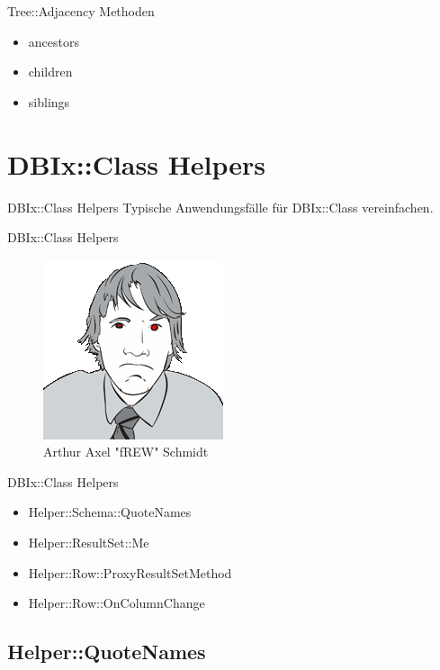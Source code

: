 \begin{frame}{Tree::Adjacency Methoden}
\begin{itemize}
\item ancestors
\item children
\item siblings
\end{itemize}
\end{frame}

\section{DBIx::Class Helpers}

\begin{frame}{DBIx::Class Helpers}
Typische Anwendungsfälle für DBIx::Class vereinfachen.
\end{frame}

\begin{frame}{DBIx::Class Helpers}
\begin{figure}[!ht]
\centering
\includegraphics[width=0.4\linewidth]{img/frew.png}
\caption{Arthur Axel "fREW" Schmidt}
\end{figure}
\end{frame}


\begin{frame}{DBIx::Class Helpers}
\begin{itemize}
\item Helper::Schema::QuoteNames
\item Helper::ResultSet::Me
\item Helper::Row::ProxyResultSetMethod
\item Helper::Row::OnColumnChange
\end{itemize}
\end{frame}

\subsection{Helper::QuoteNames}

